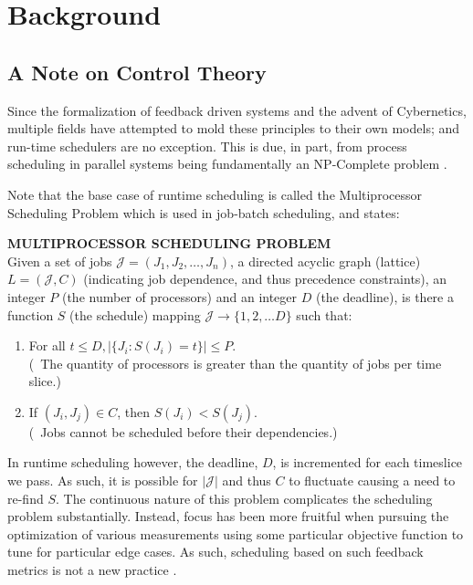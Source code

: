 \chapter{Background}
%
\label{chap:background}

\section{A Note on Control Theory}
\label{sec:a note on control theory}

Since the formalization of feedback driven systems and the advent of 
Cybernetics, multiple fields have attempted to mold these principles to their 
own models; and run-time schedulers are no exception. This is due, in part, from
process scheduling in parallel systems being fundamentally an NP-Complete 
problem \cite{bruno1976computer}. 

Note that the base case of runtime scheduling is called the Multiprocessor 
Scheduling Problem which is used in job-batch scheduling, and states:
\begin{newdef}
    {\bf MULTIPROCESSOR SCHEDULING PROBLEM}\\ 
    Given a set of jobs $\mathscr{J} = (J_1, J_2, \ldots, J_n)$, a directed 
    acyclic graph (lattice) $L = (\mathscr{J}, C)$ (indicating job dependence,
    and thus precedence constraints), an integer $P$ (the number of processors) 
    and an integer $D$ (the deadline), is there a function $S$ (the schedule)
    mapping $\mathscr{J} \rightarrow \{1, 2, \ldots D\}$ such that:
    \begin{enumerate}
        \item For all $t \leq D, |\{J_i : S(J_i) = t \}| \leq P$.\\ 
        (\ie~The quantity of processors is greater than the quantity of jobs per time slice.)
        \item If $(J_i, J_j) \in C$, then $S(J_i) < S(J_j)$. \\
        (\ie~Jobs cannot be scheduled before their dependencies.)
    \end{enumerate}
\end{newdef}
\noindent
In runtime scheduling however, the deadline, $D$, is incremented for each timeslice we
pass. As such, it is possible for $|\mathscr{J}|$ and thus $C$ to fluctuate 
causing a need to re-find $S$. The continuous nature of this problem complicates 
the scheduling problem substantially.
Instead, focus has been more fruitful when pursuing the optimization of various 
measurements using some particular objective function 
\cite{garey1978performance} 
to tune for particular edge cases. As such, scheduling based on such feedback 
metrics is not a new practice \cite{dietz1997use}.

